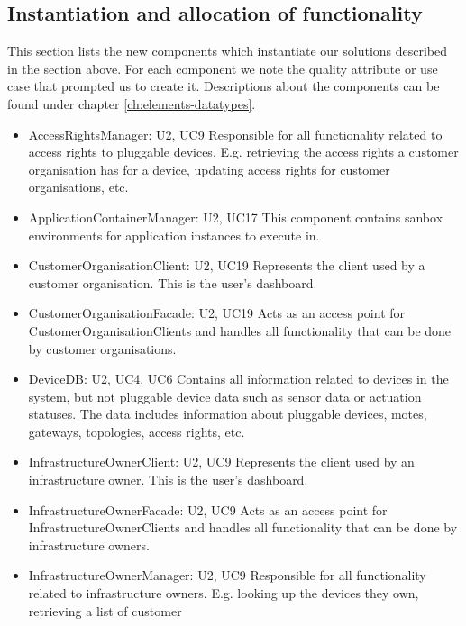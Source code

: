 {{{\subsection{Instantiation and allocation of functionality}
    This section lists the new components which instantiate our solutions
    described in the section above. For each component we note the quality
    attribute or use case that prompted us to create it. Descriptions about
    the components can be found under chapter \ref{ch:elements-datatypes}. \\

    \begin{itemize}
        \item AccessRightsManager: U2, UC9
            Responsible for all functionality related to access rights to pluggable devices.
            E.g. retrieving the access rights a customer organisation has for a device,
            updating access rights for customer organisations, etc.
        \item ApplicationContainerManager: U2, UC17
            This component contains sanbox environments for application instances to execute in.
        \item CustomerOrganisationClient: U2, UC19
            Represents the client used by a customer organisation. This is the user's dashboard.
        \item CustomerOrganisationFacade: U2, UC19
            Acts as an access point for CustomerOrganisationClients and handles all functionality that can be done by customer organisations.
        \item DeviceDB: U2, UC4, UC6
            Contains all information related to devices in the system, but not pluggable device
            data such as sensor data or actuation statuses. The data includes
            information about pluggable devices, motes, gateways, topologies,
            access rights, etc.
        \item InfrastructureOwnerClient: U2, UC9
            Represents the client used by an infrastructure owner. This is the user's dashboard.
        \item InfrastructureOwnerFacade: U2, UC9
            Acts as an access point for InfrastructureOwnerClients and handles all functionality that can be done by infrastructure owners.
        \item InfrastructureOwnerManager: U2, UC9
            Responsible for all functionality related to infrastructure owners. E.g.
            looking up the devices they own, retrieving a list of customer

\end{itemize}}}}

